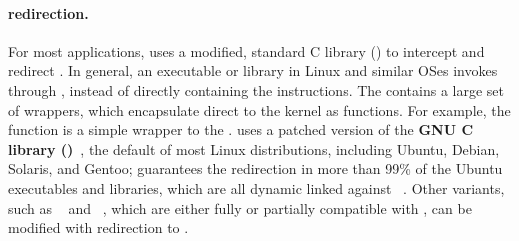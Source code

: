 



\paragraph{\Linuxapi{} redirection.}
For most applications,
\thelibos{} 
uses a modified, standard C library (\libc{}) to intercept and redirect \linuxapis{}.
In general, an executable or library in Linux and similar OSes invokes \linuxapis{} through \libc{},
instead of directly containing the  instructions.
The \libc{}
contains a large set of \linuxapi{} wrappers,
which encapsulate direct \linuxapis{} to the kernel as functions.
For example, the \libc{} function  is a simple wrapper to the  \linuxapi{}.
\thelibos{} uses a patched version
of the {\bf GNU C library (\glibc{})}~\cite{glibc},
the default \libc{} of most Linux distributions, including Ubuntu, Debian, Solaris, and Gentoo;
\thelibos{}
guarantees
the \linuxapi{} redirection
in more than 99\% of the Ubuntu executables and libraries, which are all dynamic linked against \glibc{}~\cite{tsai16apistudy}.
Other \libc{} variants, such as ~\cite{uclibc} and ~\cite{musl},
which are either fully or partially compatible with \glibc{},
can be modified with \linuxapi{} redirection to \thelibos{}.














